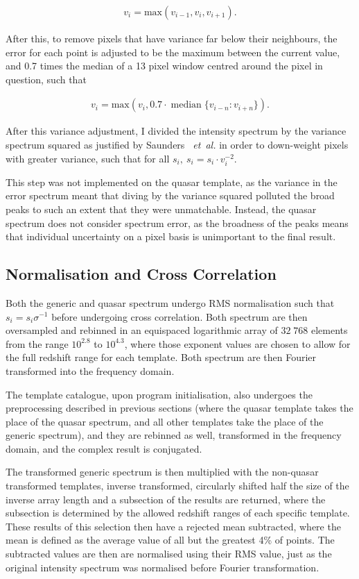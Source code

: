 \documentclass[titlesmallcaps, examinerscopy, copyrightpage]{uqthesis}
\newcommand{\brac}[1]{\left( #1 \right)}
\newcommand {\etal} {\emph{~et~al.} }
\DeclareMathOperator*{\median}{median}
\begin{document}
\begin{align}
v_i = \mathrm{max}(v_{i-1}, v_i, v_{i+1}).
\end{align}

After this, to remove pixels that have variance far below their neighbours, the error for each point is adjusted to be the maximum between the current value, and 0.7 times the median of a 13 pixel window centred around the pixel in question, such that

\begin{align}
v_i = \mathrm{max}\brac{v_i, 0.7\cdot \median\{v_{i-n}:v_{i+n}\}}.
\end{align}

After this variance adjustment, I divided the intensity spectrum by the variance spectrum squared as justified by Saunders \etal \cite{saunders2004improvements} in order to down-weight pixels with greater variance, such that for all $s_i,\ s_i = s_i \cdot v_i^{-2}$.

This step was not implemented on the quasar template, as the variance in the error spectrum meant that diving by the variance squared polluted the broad peaks to such an extent that they were unmatchable. Instead, the quasar spectrum does not consider spectrum error, as the broadness of the peaks means that individual uncertainty on a pixel basis is unimportant to the final result.

\subsection{Normalisation and Cross Correlation} \label{sec:transform}

Both the generic and quasar spectrum undergo RMS normalisation such that $s_i = s_i \sigma^{-1}$ before undergoing cross correlation. Both spectrum are then oversampled and rebinned in an equispaced logarithmic array of $32\;768$ elements from the range $10^{2.8}$ to $10^{4.3}$, where those exponent values are chosen to allow for the full redshift range for each template. Both spectrum are then Fourier transformed into the frequency domain.

The template catalogue, upon program initialisation, also undergoes the preprocessing described in previous sections (where the quasar template takes the place of the quasar spectrum, and all other templates take the place of the generic spectrum), and they are rebinned as well, transformed in the frequency domain, and the complex result is conjugated.

The transformed generic spectrum is then multiplied with the non-quasar transformed templates, inverse transformed, circularly shifted half the size of the inverse array length and a subsection of the results are returned, where the subsection is determined by the allowed redshift ranges of each specific template. These results of this selection then have a rejected mean subtracted, where the mean is defined as the average value of all but the greatest 4\% of points. The subtracted values are then are normalised using their RMS value, just as the original intensity spectrum was normalised before Fourier transformation.
\end{document}
